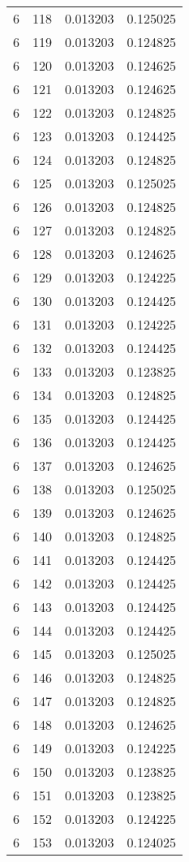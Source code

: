 \begin{longtable}{rrrr}
6 & 118 & 0.013203 & 0.125025 \\
6 & 119 & 0.013203 & 0.124825 \\
6 & 120 & 0.013203 & 0.124625 \\
6 & 121 & 0.013203 & 0.124625 \\
6 & 122 & 0.013203 & 0.124825 \\
6 & 123 & 0.013203 & 0.124425 \\
6 & 124 & 0.013203 & 0.124825 \\
6 & 125 & 0.013203 & 0.125025 \\
6 & 126 & 0.013203 & 0.124825 \\
6 & 127 & 0.013203 & 0.124825 \\
6 & 128 & 0.013203 & 0.124625 \\
6 & 129 & 0.013203 & 0.124225 \\
6 & 130 & 0.013203 & 0.124425 \\
6 & 131 & 0.013203 & 0.124225 \\
6 & 132 & 0.013203 & 0.124425 \\
6 & 133 & 0.013203 & 0.123825 \\
6 & 134 & 0.013203 & 0.124825 \\
6 & 135 & 0.013203 & 0.124425 \\
6 & 136 & 0.013203 & 0.124425 \\
6 & 137 & 0.013203 & 0.124625 \\
6 & 138 & 0.013203 & 0.125025 \\
6 & 139 & 0.013203 & 0.124625 \\
6 & 140 & 0.013203 & 0.124825 \\
6 & 141 & 0.013203 & 0.124425 \\
6 & 142 & 0.013203 & 0.124425 \\
6 & 143 & 0.013203 & 0.124425 \\
6 & 144 & 0.013203 & 0.124425 \\
6 & 145 & 0.013203 & 0.125025 \\
6 & 146 & 0.013203 & 0.124825 \\
6 & 147 & 0.013203 & 0.124825 \\
6 & 148 & 0.013203 & 0.124625 \\
6 & 149 & 0.013203 & 0.124225 \\
6 & 150 & 0.013203 & 0.123825 \\
6 & 151 & 0.013203 & 0.123825 \\
6 & 152 & 0.013203 & 0.124225 \\
6 & 153 & 0.013203 & 0.124025 \\

\end{longtable}
